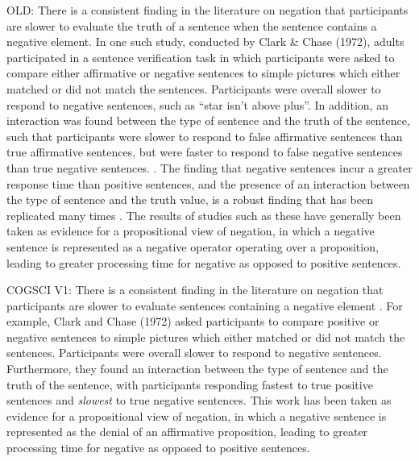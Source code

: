 \documentclass[man]{apa2}
\begin{document}
OLD: 
There is a consistent finding in the literature on negation that participants are slower to evaluate the truth of a sentence when the sentence contains a negative element.  In one such study, conducted by Clark \& Chase (1972), adults participated in a sentence verification task in which participants were asked to compare either affirmative or negative sentences to simple pictures which either matched or did not match the sentences.  Participants were overall slower to respond to negative sentences, such as ``star isn't above plus''.  In addition, an interaction was found between the type of sentence and the truth of the sentence, such that participants were slower to respond to false affirmative sentences than true affirmative sentences, but were faster to respond to false negative sentences than true negative sentences.  \cite{hclark1972}.  The finding that negative sentences incur a greater response time than positive sentences, and the presence of an interaction between the type of sentence and the truth value, is a robust finding that has been replicated many times  \cite{carpenter1975, just1971, just1976}.  The results of studies such as these have generally been taken as evidence for a propositional view of negation, in which a negative sentence is represented as a negative operator operating over a proposition, leading to greater processing time for negative as opposed to positive sentences.  

COGSCI V1:
There is a consistent finding in the literature on negation that participants are slower to evaluate sentences containing a negative element  \cite{hclark1972, carpenter1975, just1971, just1976}.  For example, Clark and Chase (1972) asked participants to compare positive or negative sentences to simple pictures which either matched or did not match the sentences.  Participants were overall slower to respond to negative sentences.  Furthermore, they found an interaction between the type of sentence and the truth of the sentence, with participants responding fastest to true positive sentences and \emph{slowest} to true negative sentences.  This work has been taken as evidence for a propositional view of negation, in which a negative sentence is represented as the denial of an affirmative proposition, leading to greater processing time for negative as opposed to positive sentences. 
\end{document}

